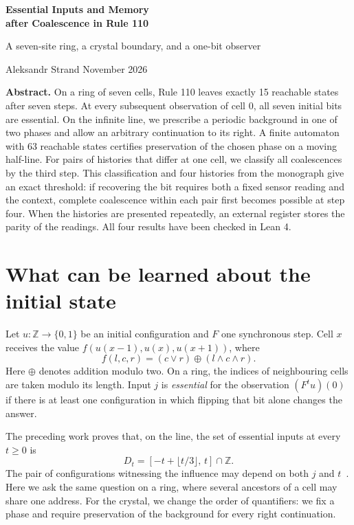 \documentclass[11pt,a4paper]{article}
\theoremstyle{compact}
\newcommand{\Z}{\mathbb Z}
\begin{document}
\thispagestyle{firstpage}
\begin{flushleft}
{\LARGE\bfseries Essential Inputs and Memory\\[.12em]
after Coalescence in Rule 110}\par
\vspace{.55em}
{\large\color{muted}A seven-site ring, a crystal boundary, and a one-bit observer}\par
\vspace{.7em}
Aleksandr Strand\enspace\textperiodcentered{} November 2026
\end{flushleft}
\vspace{.35em}
\noindent\textbf{Abstract.}
On a ring of seven cells, Rule 110 leaves exactly 15 reachable states after
seven steps. At every subsequent observation of cell 0, all seven initial bits
are essential. On the infinite line, we prescribe a periodic background in one
of two phases and allow an arbitrary continuation to its right. A finite
automaton with 63 reachable states certifies preservation of the chosen phase
on a moving half-line. For pairs of histories that differ at one cell, we
classify all coalescences by the third step. This classification and four
histories from the monograph give an exact threshold: if recovering the bit
requires both a fixed sensor reading and the context, complete coalescence
within each pair first becomes possible at step four. When the histories are
presented repeatedly, an external register stores the parity of the readings.
All four results have been checked in Lean 4.

\section{What can be learned about the initial state}

Let $u:\Z\to\{0,1\}$ be an initial configuration and $F$ one synchronous
step. Cell $x$ receives the value $f(u(x-1),u(x),u(x+1))$, where
\[
 f(l,c,r)=(c\lor r)\oplus(l\land c\land r).
\]
Here $\oplus$ denotes addition modulo two. On a ring, the indices of neighbouring
cells are taken modulo its length. Input $j$ is \emph{essential} for the
observation $(F^tu)(0)$ if there is at least one configuration in which flipping
that bit alone changes the answer.

The preceding work proves that, on the line, the set of essential inputs at
every $t\ge0$ is
\[
 D_t=[-t+\lfloor t/3\rfloor,\,t]\cap\Z.
\]
The pair of configurations witnessing the influence may depend on both $j$ and
$t$~\cite{fronts}. Here we ask the same question on a ring, where several
ancestors of a cell may share one address. For the crystal, we change the order
of quantifiers: we fix a phase and require preservation of the background for
every right continuation.
\end{document}
